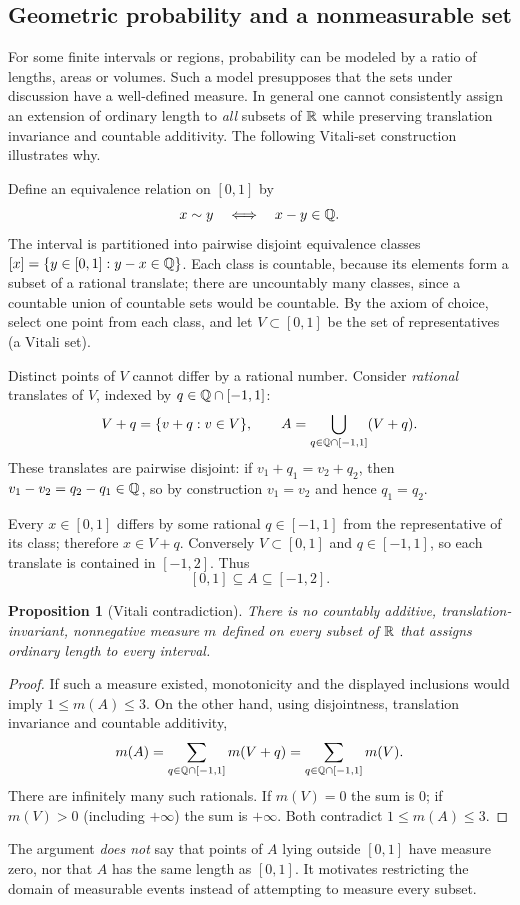 \documentclass[10pt,a4paper]{article}
\newtheorem{proposition}{Proposition}
\begin{document}
\subsection*{Geometric probability and a nonmeasurable set}
For some finite intervals or regions, probability can be modeled by a ratio of lengths, areas or volumes. Such a model presupposes that the sets under discussion have a well-defined measure. In general one cannot consistently assign an extension of ordinary length to \emph{all} subsets of $\mathbb R$ while preserving translation invariance and countable additivity. The following Vitali-set construction illustrates why.

Define an equivalence relation on $[0,1]$ by
\[
x\sim y\quad\Longleftrightarrow\quad x-y\in\mathbb Q.
\]
The interval is partitioned into pairwise disjoint equivalence classes $[x]=\{y\in[0,1]:y-x\in\mathbb Q\}$. Each class is countable, because its elements form a subset of a rational translate; there are uncountably many classes, since a countable union of countable sets would be countable. By the axiom of choice, select one point from each class, and let $V\subset[0,1]$ be the set of representatives (a Vitali set).

Distinct points of $V$ cannot differ by a rational number. Consider \emph{rational} translates of $V$, indexed by $q\in\mathbb Q\cap[-1,1]$:
\[
V+q=\{v+q:v\in V\},\qquad
A=\bigcup_{q\in\mathbb Q\cap[-1,1]}(V+q).
\]
These translates are pairwise disjoint: if $v_1+q_1=v_2+q_2$, then $v_1-v_2=q_2-q_1\in\mathbb Q$, so by construction $v_1=v_2$ and hence $q_1=q_2$.

Every $x\in[0,1]$ differs by some rational $q\in[-1,1]$ from the representative of its class; therefore $x\in V+q$. Conversely $V\subset[0,1]$ and $q\in[-1,1]$, so each translate is contained in $[-1,2]$. Thus
\[
[0,1]\subseteq A\subseteq[-1,2].
\]
\begin{proposition}[Vitali contradiction]
There is no countably additive, translation-invariant, nonnegative measure $m$ defined on \emph{every subset} of $\mathbb R$ that assigns ordinary length to every interval.
\end{proposition}
\begin{proof}
If such a measure existed, monotonicity and the displayed inclusions would imply $1\le m(A)\le3$. On the other hand, using disjointness, translation invariance and countable additivity,
\[
m(A)=\sum_{q\in\mathbb Q\cap[-1,1]}m(V+q)
=\sum_{q\in\mathbb Q\cap[-1,1]}m(V).
\]
There are infinitely many such rationals. If $m(V)=0$ the sum is $0$; if $m(V)>0$ (including $+\infty$) the sum is $+\infty$. Both contradict $1\le m(A)\le3$.
\end{proof}
The argument \emph{does not} say that points of $A$ lying outside $[0,1]$ have measure zero, nor that $A$ has the same length as $[0,1]$. It motivates restricting the domain of measurable events instead of attempting to measure every subset.
\end{document}
